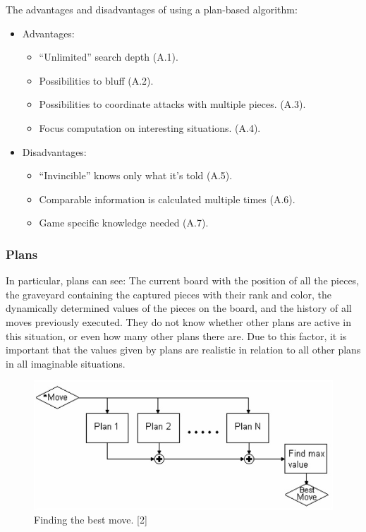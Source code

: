 \documentclass{article}
\begin{document}
The advantages and disadvantages of using a plan-based algorithm:

\begin{itemize}
  \item Advantages:
  \begin{itemize}
    \item “Unlimited” search depth (A.1).
    \item Possibilities to bluff (A.2).
    \item Possibilities to coordinate attacks with multiple pieces. (A.3).
    \item Focus computation on interesting situations. (A.4).
  \end{itemize}
  \item Disadvantages:
  \begin{itemize}
    \item “Invincible” knows only what it’s told (A.5).
    \item Comparable information is calculated multiple times (A.6).
    \item Game specific knowledge needed (A.7).
  \end{itemize}
\end{itemize}

\subsubsection{Plans}

In particular, plans can see: The current board with the position of all the pieces, the graveyard containing the captured pieces with their rank and color, 
the dynamically determined values of the pieces on the board, and the history of all moves previously executed. 
They do not know whether other plans are active in this situation, or even how many other plans there are. 
Due to this factor, it is important that the values given by plans are realistic in relation to all other plans in all imaginable situations.

\begin{figure}
  \includegraphics[scale=0.5]{plan.jpg}
  \caption{Finding the best move. [2]}
  \label{fig:plans1}
\end{figure}
\end{document}
